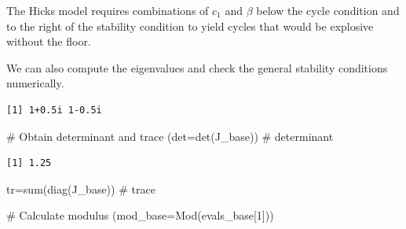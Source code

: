 \documentclass[
  letterpaper,
  DIV=11,
  numbers=noendperiod]{scrreprt}
\newenvironment{Shaded}{\begin{snugshade}}{\end{snugshade}}
\newcommand{\AttributeTok}[1]{\textcolor[rgb]{0.40,0.45,0.13}{#1}}
\newcommand{\CommentTok}[1]{\textcolor[rgb]{0.37,0.37,0.37}{#1}}
\newcommand{\ConstantTok}[1]{\textcolor[rgb]{0.56,0.35,0.01}{#1}}
\newcommand{\DecValTok}[1]{\textcolor[rgb]{0.68,0.00,0.00}{#1}}
\newcommand{\DocumentationTok}[1]{\textcolor[rgb]{0.37,0.37,0.37}{\textit{#1}}}
\newcommand{\FunctionTok}[1]{\textcolor[rgb]{0.28,0.35,0.67}{#1}}
\newcommand{\NormalTok}[1]{\textcolor[rgb]{0.00,0.23,0.31}{#1}}
\newcommand{\OtherTok}[1]{\textcolor[rgb]{0.00,0.23,0.31}{#1}}
\newcommand{\SpecialCharTok}[1]{\textcolor[rgb]{0.37,0.37,0.37}{#1}}
\begin{document}
The Hicks model requires combinations of \(c_1\) and \(\beta\) below the
cycle condition and to the right of the stability condition to yield
cycles that would be explosive without the floor.

We can also compute the eigenvalues and check the general stability
conditions numerically.

\begin{Shaded}
\end{Shaded}

\begin{verbatim}
[1] 1+0.5i 1-0.5i
\end{verbatim}

\begin{Shaded}
\begin{Highlighting}[]
\CommentTok{\# Obtain determinant and trace}
\NormalTok{(}\AttributeTok{det=}\FunctionTok{det}\NormalTok{(J\_base))      }\CommentTok{\# determinant}
\end{Highlighting}
\end{Shaded}

\begin{verbatim}
[1] 1.25
\end{verbatim}

\begin{Shaded}
\begin{Highlighting}[]
\NormalTok{tr}\OtherTok{=}\FunctionTok{sum}\NormalTok{(}\FunctionTok{diag}\NormalTok{(J\_base)) }\CommentTok{\# trace}

\CommentTok{\# Calculate modulus}
\NormalTok{(}\AttributeTok{mod\_base=}\FunctionTok{Mod}\NormalTok{(evals\_base[}\DecValTok{1}\NormalTok{]))}
\end{Highlighting}
\end{Shaded}
\end{document}
